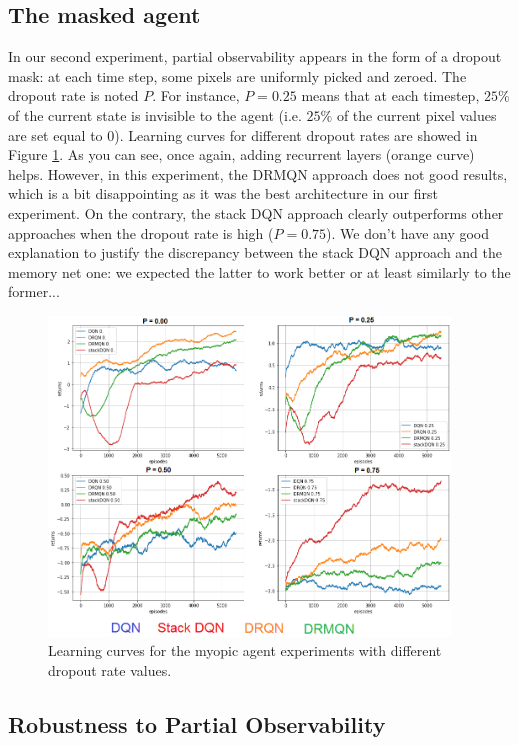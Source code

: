 \documentclass{article} %
\begin{document}
	\subsection{The masked agent}
	
	In our second experiment, partial observability appears in the form of a dropout mask: at each time step, some pixels are uniformly picked and zeroed. The dropout rate is noted $P$. For instance, $P=0.25$ means that at each timestep, $25\%$ of the current state is invisible to the agent (i.e. $25\%$ of the current pixel values are set equal to $0$). Learning curves for different dropout rates are showed in Figure \ref{masked_curves}. As you can see, once again, adding recurrent layers (orange curve) helps. However, in this experiment, the DRMQN approach does not good results, which is a bit disappointing as it was the best architecture in our first experiment. On the contrary, the stack DQN approach clearly outperforms other approaches when the dropout rate is high ($P=0.75$). We don't have any good explanation to justify the discrepancy between the stack DQN approach and the memory net one: we expected the latter to work better or at least similarly to the former...
	
	\begin{figure}
		\includegraphics[width=0.95\textwidth]{imgs/masked_curves.png}
		\caption{Learning curves for the myopic agent experiments with different dropout rate values.}
		\label{masked_curves}
	\end{figure}
	
	\subsection{Robustness to Partial Observability}
	
\end{document}
